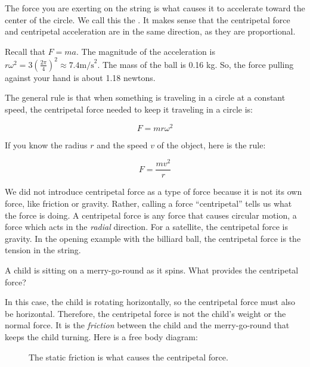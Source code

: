 The force you are exerting on the string is what causes it to accelerate toward the center of the circle. We call this the . It makes sense that the centripetal force and centripetal acceleration are in the same direction, as they are proportional. 

Recall that $F = m a$. The magnitude of the acceleration is $r \omega^2 = 3 \left(\frac{2 \pi}{4}\right)^2 \approx 7.4 \mathrm{ m/s}^2$. The mass
of the ball is 0.16 kg. So, the force pulling against your hand is about 1.18 newtons.

The general rule is that when something is traveling in a circle at a
constant speed, the centripetal force needed to keep it traveling in a
circle is:

$$F = m r \omega^2$$

If you know the radius $r$ and the speed $v$ of the object, here is the rule:

$$F = \frac{m v^2}{r}$$

We did not introduce centripetal force as a type of force because it is not its own force, like friction or gravity. Rather, calling a force ``centripetal'' tells us what the force is doing. A centripetal force is any force that causes circular motion, a force which acts in the \emph{radial} direction. For a satellite, the centripetal force is gravity. In the opening example with the billiard ball, the centripetal force is the tension in the string.

\begin{Worked}
\begin{Problem}
A child is sitting on a merry-go-round as it spins. What provides the centripetal force?
\end{Problem}
\begin{Solution}
In this case, the child is rotating horizontally, so the centripetal force must also be horizontal. Therefore, the centripetal force is not the child's weight or the normal force. It is the \textit{friction} between the child and the merry-go-round that keeps the child turning. Here is a free body diagram:

\begin{figure}[H]
  \centering
  \caption{The static friction is what causes the centripetal force.}
  \label{fig:merrygoround_fbd}
\end{figure}
\end{Solution}
\end{Worked}


